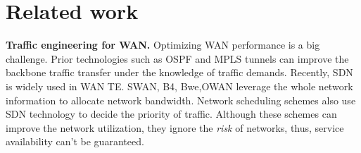 \documentclass[sigconf]{acmart}
\begin{document}
%
%
%
%
%
%
%
%
%
%
%
%
%






\section{Related work}\label{relate}

\textbf{Traffic engineering for WAN.}
Optimizing WAN performance is a big challenge.
Prior technologies such as OSPF\cite{OSPF} and MPLS tunnels \cite{MATE,Tightrope} can improve the backbone traffic transfer under the knowledge of traffic demands.
Recently, SDN is widely used in WAN TE.
SWAN\cite{swan}, B4\cite{B4,hong2018b4}, Bwe\cite{bwe},OWAN\cite{OWAN} leverage the whole network information to allocate network bandwidth.
Network scheduling schemes \cite{calendaring,dynamic,D3} also use SDN technology to decide the priority of traffic.
Although these schemes can improve the network utilization, they ignore the \textit{risk} of networks, thus, service availability can't be guaranteed.
\end{document}
